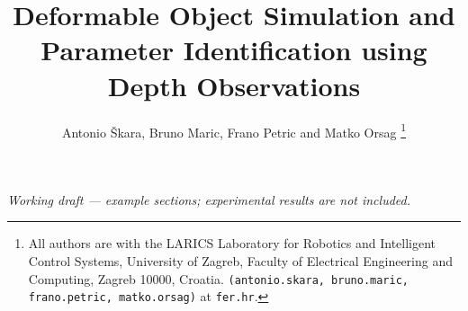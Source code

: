 \documentclass[letterpaper,10pt,conference]{ieeeconf}
\title{\LARGE\bf
Deformable Object Simulation and Parameter Identification using Depth Observations
}
\author{Antonio \v{S}kara, Bruno Maric, Frano Petric and Matko Orsag%
\thanks{All authors are with the LARICS Laboratory for Robotics and Intelligent Control Systems, University of Zagreb, Faculty of Electrical Engineering and Computing, Zagreb 10000, Croatia. {\tt\small (antonio.skara, bruno.maric, frano.petric, matko.orsag)} at {\tt\small fer.hr}.}%
}
\begin{document}
\maketitle
\thispagestyle{empty}
\pagestyle{empty}
\begin{center}
\footnotesize\itshape Working draft --- example sections; experimental results are not included.
\end{center}








\end{document}
